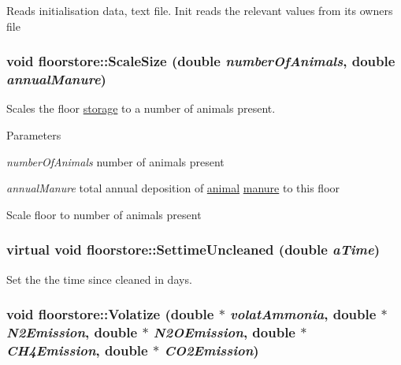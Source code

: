 Reads initialisation data, text file. Init reads the relevant values from its owners file \hypertarget{classfloorstore_a568e6257a1fb9f6ca2a3c6113316aa3d}{
\subsubsection[{ScaleSize}]{\setlength{\rightskip}{0pt plus 5cm}void floorstore::ScaleSize (double {\em numberOfAnimals}, \/  double {\em annualManure})}}
\label{classfloorstore_a568e6257a1fb9f6ca2a3c6113316aa3d}


Scales the floor \hyperlink{classstorage}{storage} to a number of animals present. 
\begin{DoxyParams}{Parameters}
\item[{\em numberOfAnimals}]number of animals present \item[{\em annualManure}]total annual deposition of \hyperlink{classanimal}{animal} \hyperlink{classmanure}{manure} to this floor\end{DoxyParams}
Scale floor to number of animals present \hypertarget{classfloorstore_a7279c61e34129cafea8b4d690b8c79b8}{
\subsubsection[{SettimeUncleaned}]{\setlength{\rightskip}{0pt plus 5cm}virtual void floorstore::SettimeUncleaned (double {\em aTime})}}
\label{classfloorstore_a7279c61e34129cafea8b4d690b8c79b8}


Set the the time since cleaned in days. \hypertarget{classfloorstore_aeaade97a9f21a03bd2f5bc5acd916056}{
\subsubsection[{Volatize}]{\setlength{\rightskip}{0pt plus 5cm}void floorstore::Volatize (double $\ast$ {\em volatAmmonia}, \/  double $\ast$ {\em N2Emission}, \/  double $\ast$ {\em N2OEmission}, \/  double $\ast$ {\em CH4Emission}, \/  double $\ast$ {\em CO2Emission})}}
\label{classfloorstore_aeaade97a9f21a03bd2f5bc5acd916056}



